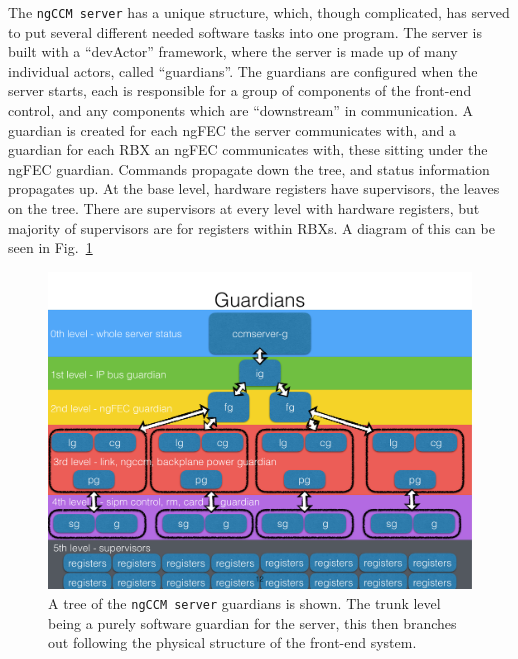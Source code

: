The \texttt{ngCCM server} has a unique structure, which, though complicated, has served to put several different needed software tasks into one program. The server is built with a ``devActor'' framework, where the server is made up of many individual actors, called ``guardians''. The guardians are configured when the server starts, each is responsible for a group of components of the front-end control, and any components which are ``downstream'' in communication. A guardian is created for each ngFEC the server communicates with, and a guardian for each RBX an ngFEC communicates with, these sitting under the ngFEC guardian. Commands propagate down the tree, and status information propagates up. At the base level, hardware registers have supervisors, the leaves on the tree. There are supervisors at every level with hardware registers, but majority of supervisors are for registers within RBXs. A diagram of this can be seen in Fig.~\ref{fig:ngCCMserve}
\begin{figure}[!tp]
    \centering
    \includegraphics[width=\textwidth]{figures/ngCCMserverGuardians.pdf}
    \caption[
       \HCAL ngCCM server guardian tree. 
    ]{
       A tree of the \texttt{ngCCM server} guardians is shown.  The trunk level being a purely software guardian for the server, this then branches out following the physical structure of the front-end system.   
    }
    \label{fig:ngCCMserve}
\end{figure}

